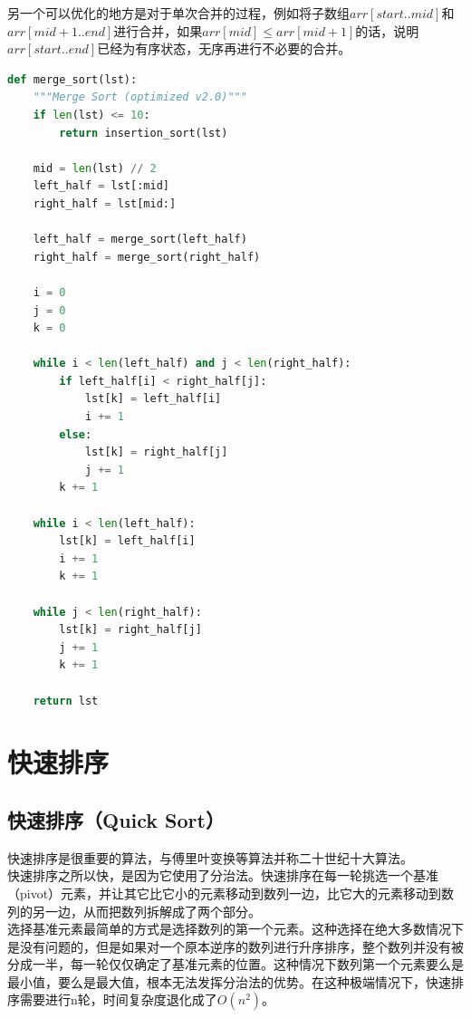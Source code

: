 另一个可以优化的地方是对于单次合并的过程，例如将子数组$ arr[start..mid] $和$ arr[mid+1..end] $进行合并，如果$ arr[mid] \le arr[mid+1] $的话，说明$ arr[start..end] $已经为有序状态，无序再进行不必要的合并。\\


\begin{lstlisting}[language=Python]
def merge_sort(lst):
    """Merge Sort (optimized v2.0)"""
    if len(lst) <= 10:
        return insertion_sort(lst)
    
    mid = len(lst) // 2
    left_half = lst[:mid]
    right_half = lst[mid:]

    left_half = merge_sort(left_half)
    right_half = merge_sort(right_half)

    i = 0
    j = 0
    k = 0

    while i < len(left_half) and j < len(right_half):
        if left_half[i] < right_half[j]:
            lst[k] = left_half[i]
            i += 1
        else:
            lst[k] = right_half[j]
            j += 1
        k += 1
    
    while i < len(left_half):
        lst[k] = left_half[i]
        i += 1
        k += 1
    
    while j < len(right_half):
        lst[k] = right_half[j]
        j += 1
        k += 1
    
    return lst
\end{lstlisting}

\newpage

\section{快速排序}

\subsection{快速排序（Quick Sort）}

快速排序是很重要的算法，与傅里叶变换等算法并称二十世纪十大算法。\\

快速排序之所以快，是因为它使用了分治法。快速排序在每一轮挑选一个基准（pivot）元素，并让其它比它小的元素移动到数列一边，比它大的元素移动到数列的另一边，从而把数列拆解成了两个部分。\\

选择基准元素最简单的方式是选择数列的第一个元素。这种选择在绝大多数情况下是没有问题的，但是如果对一个原本逆序的数列进行升序排序，整个数列并没有被分成一半，每一轮仅仅确定了基准元素的位置。这种情况下数列第一个元素要么是最小值，要么是最大值，根本无法发挥分治法的优势。在这种极端情况下，快速排序需要进行n轮，时间复杂度退化成了$ O(n^2) $。


